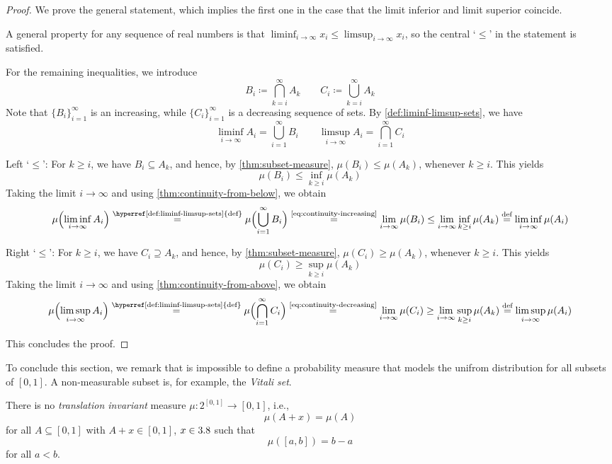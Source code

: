 \begin{proof}
We prove the general statement, which implies the first one in the case that the limit inferior and limit superior coincide.

A general property for any sequence of real numbers is that $\liminf_{i\to\infty} x_i \leq \limsup_{i\to\infty} x_i$, so the central `$\leq$' in the statement is satisfied.

For the remaining inequalities, we introduce
\[
B_i \coloneq \bigcap_{k=i}^{\infty} A_k
\qquad
C_i \coloneq \bigcup_{k=i}^{\infty} A_k
\]
Note that $\{B_i\}_{i=1}^{\infty}$ is an increasing, while $\{C_i\}_{i=1}^{\infty}$ is a decreasing sequence of sets.
By \autoref{def:liminf-limsup-sets}, we have 
\[
\liminf_{i\to\infty} A_i = \bigcup_{i=1}^{\infty} B_i
\qquad
\limsup_{i\to\infty} A_i = \bigcap_{i=1}^{\infty} C_i
\]

Left `$\leq$':
For $k \geq i$, we have $B_i \subseteq A_k$, and hence, by \autoref{thm:subset-measure}, $\mu(B_i) \leq \mu(A_k)$, whenever $k \geq i$.
This yields
\[
\mu(B_i) \leq \inf_{k \geq i} \mu(A_k)
\]
Taking the limit $i \to \infty$ and using \autoref{thm:continuity-from-below}, we obtain
\[
\mu\Bigl(\liminf_{i\to\infty} A_i\Bigr)
\overset{\text{\hyperref[def:liminf-limsup-sets]{def}}}{=}
\mu\Bigl(\bigcup_{i=1}^{\infty} B_i\Bigr)
\overset{\text{\eqref{eq:continuity-increasing}}}{=}
\lim_{i \to \infty} \mu(B_i)
\leq
\lim_{i \to \infty} \inf_{k \geq i} \mu(A_k)
\overset{\text{def}}{=}
\liminf_{i\to\infty} \mu(A_i)
\]


Right `$\leq$':
For $k \geq i$, we have $C_i \supseteq A_k$, and hence, by \autoref{thm:subset-measure}, $\mu(C_i) \geq \mu(A_k)$, whenever $k \geq i$.
This yields
\[
\mu(C_i) \geq \sup_{k \geq i} \mu(A_k)
\]
Taking the limit $i \to \infty$ and using \autoref{thm:continuity-from-above}, we obtain
\[
\mu\Bigl(\limsup_{i\to\infty} A_i\Bigr)
\overset{\text{\hyperref[def:liminf-limsup-sets]{def}}}{=}
\mu\Bigl(\bigcap_{i=1}^{\infty} C_i\Bigr)
\overset{\text{\eqref{eq:continuity-decreasing}}}{=}
\lim_{i \to \infty} \mu(C_i)
\geq
\lim_{i \to \infty} \sup_{k \geq i} \mu(A_k)
\overset{\text{def}}{=}
\limsup_{i\to\infty} \mu(A_i)
\]

This concludes the proof.
\end{proof}




To conclude this section, we remark that is impossible to define a probability measure that models the unifrom distribution for all subsets of $[0,1]$.
A non-measurable subset is, for example, the \emph{Vitali set}.
\begin{fact}
There is no \emph{translation invariant} measure $\mu : 2^{[0,1]} \to [0,1]$, i.e.,
\[
\mu(A + x) = \mu(A)
\]
for all $A \subseteq [0,1]$ with $A + x \in [0,1]$, $x \in 3.8$ such that
\[
\mu([a,b]) = b - a
\]
for all $a < b$.
\end{fact}







